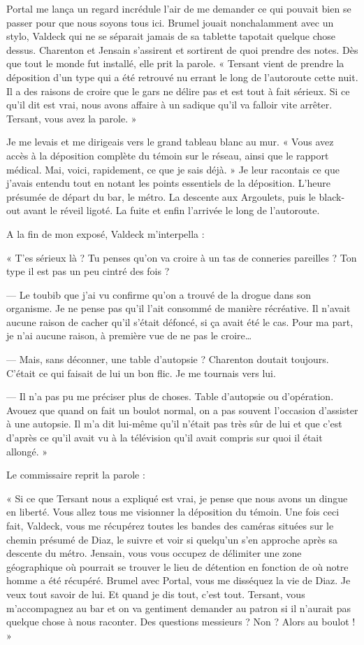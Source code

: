 Portal me lança un regard incrédule l'air de me demander ce qui pouvait bien se passer pour que nous soyons tous ici.
Brumel jouait nonchalamment avec un stylo, Valdeck qui ne se séparait jamais de sa tablette tapotait quelque chose
dessus. Charenton et Jensain s'assirent et sortirent de quoi prendre des notes. Dès que tout le monde fut installé, 
elle prit la parole. « Tersant vient de prendre la déposition d'un type qui a été retrouvé nu errant le long de 
l'autoroute cette nuit. Il a des raisons de croire que le gars ne délire pas et est tout à fait sérieux. Si ce qu'il 
dit est vrai, nous avons affaire à un sadique qu'il va falloir vite arrêter. Tersant, vous avez la parole. »

Je me levais et me dirigeais vers le grand tableau blanc au mur. « Vous avez accès à la déposition complète du témoin 
sur le réseau, ainsi que le rapport médical. Mai, voici, rapidement, ce que je sais déjà.  » Je leur racontais ce que 
j'avais entendu tout en notant les points essentiels de la déposition. L'heure présumée de départ du bar, le métro. La 
descente aux Argoulets, puis le black-out avant le réveil ligoté. La fuite et enfin l'arrivée le long de l'autoroute.

A la fin de mon exposé, Valdeck m'interpella :

« T'es sérieux là ? Tu penses qu'on va croire à un tas de conneries pareilles ? Ton type il est pas un peu cintré des 
fois ?

— Le toubib que j'ai vu confirme qu'on a trouvé de la drogue dans son organisme. Je ne pense pas qu'il l'ait consommé 
de manière récréative. Il n'avait aucune raison de  cacher qu'il s'était défoncé, si ça avait été le cas. Pour ma 
part, je n'ai aucune raison, à première vue de ne pas le croire…

— Mais, sans déconner, une table d'autopsie ? Charenton doutait toujours. C'était ce qui faisait de lui un bon flic. 
Je me tournais vers lui.

— Il n'a pas pu me préciser plus de choses. Table d'autopsie ou d'opération. Avouez que quand on fait un boulot 
normal, on a pas souvent l'occasion d'assister à une autopsie. Il m'a dit lui-même qu'il n'était pas très sûr de lui 
et que c'est d'après ce qu'il avait vu à la télévision qu'il avait compris sur quoi il était allongé. »

Le commissaire reprit la parole :

« Si ce que Tersant nous a expliqué est vrai, je pense que nous avons un dingue en liberté. Vous allez tous me 
visionner la déposition du témoin. Une fois ceci fait, Valdeck, vous me récupérez toutes les bandes des caméras 
situées sur le chemin présumé de Diaz, le suivre et voir si quelqu'un s'en approche après sa descente du métro. 
Jensain, vous vous occupez de délimiter une zone géographique où pourrait se trouver le lieu de détention en fonction 
de où notre homme a été récupéré. Brumel avec Portal, vous me disséquez la vie de Diaz. Je veux tout savoir de lui. Et 
quand je dis tout, c'est tout. Tersant, vous m'accompagnez au bar et on va gentiment demander au patron si il n'aurait 
pas quelque chose à nous raconter. Des questions messieurs ? Non ? Alors au boulot ! »

